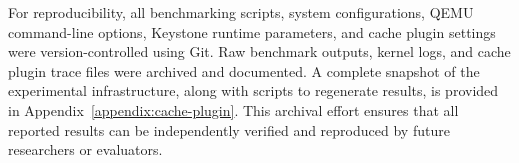 For reproducibility, all benchmarking scripts, system configurations, QEMU command-line options, Keystone runtime parameters, and cache plugin settings were version-controlled using Git. Raw benchmark outputs, kernel logs, and cache plugin trace files were archived and documented. A complete snapshot of the experimental infrastructure, along with scripts to regenerate results, is provided in Appendix~\ref{appendix:cache-plugin}. This archival effort ensures that all reported results can be independently verified and reproduced by future researchers or evaluators.
